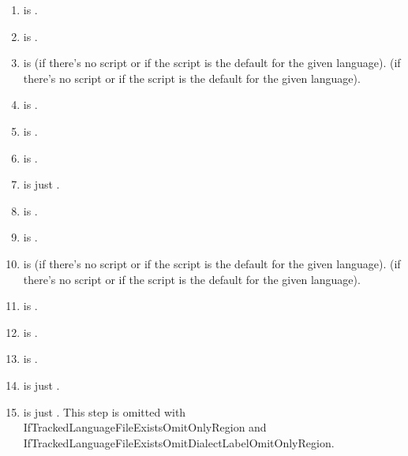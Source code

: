 \documentclass[titlepage=false,oneside,
 fontsize=12pt,captions=tableheading]{scrbook}
\begin{document}
\begin{enumerate}
\item {} is
\code{-}\code{-}\code{-}.

\item {} is
\code{-}\code{-}.

\item {} is
\code{-}\code{-} (if there's no script or if
the script is the default for the given language).
\code{-} (if there's no script or if
the script is the default for the given language).

\item {} is
\code{-}\code{-}.

\item {} is
\code{-}.

\item {} is \code{-}.
\item {} is just .

\item {} is
\code{-}\code{-}\code{-}.

\item {} is
\code{-}\code{-}.

\item {} is
\code{-}\code{-} (if there's no script or if
the script is the default for the given language).
\code{-} (if there's no script or if
the script is the default for the given language).

\item {} is
\code{-}\code{-}.

\item {} is
\code{-}.

\item {} is \code{-}.

\item {} is just .

\item {} is just .
This step is omitted with
\gls{IfTrackedLanguageFileExistsOmitOnlyRegion}
and \gls{IfTrackedLanguageFileExistsOmitDialectLabelOmitOnlyRegion}.


\end{enumerate}
\end{document}
